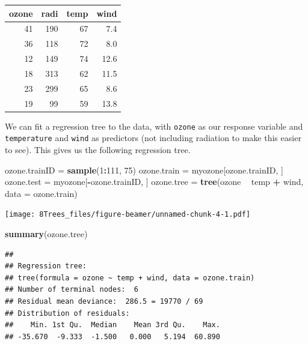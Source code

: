 \documentclass[10pt,ignorenonframetext,]{beamer}
\newenvironment{Shaded}{\begin{snugshade}}{\end{snugshade}}
\newcommand{\KeywordTok}[1]{\textcolor[rgb]{0.13,0.29,0.53}{\textbf{#1}}}
\newcommand{\DataTypeTok}[1]{\textcolor[rgb]{0.13,0.29,0.53}{#1}}
\newcommand{\DecValTok}[1]{\textcolor[rgb]{0.00,0.00,0.81}{#1}}
\newcommand{\StringTok}[1]{\textcolor[rgb]{0.31,0.60,0.02}{#1}}
\newcommand{\OperatorTok}[1]{\textcolor[rgb]{0.81,0.36,0.00}{\textbf{#1}}}
\newcommand{\NormalTok}[1]{#1}
\begin{document}
\begin{frame}[fragile]

\begin{tabular}{r|r|r|r}
\hline
ozone & radi & temp & wind\\
\hline
41 & 190 & 67 & 7.4\\
\hline
36 & 118 & 72 & 8.0\\
\hline
12 & 149 & 74 & 12.6\\
\hline
18 & 313 & 62 & 11.5\\
\hline
23 & 299 & 65 & 8.6\\
\hline
19 & 99 & 59 & 13.8\\
\hline
\end{tabular}

We can fit a regression tree to the data, with \texttt{ozone} as our
response variable and \texttt{temperature} and \texttt{wind} as
predictors (not including radiation to make this easier to see). This
gives us the following regression tree.

\end{frame}

\begin{frame}[fragile]

\footnotesize

\begin{Shaded}
\begin{Highlighting}[]
\NormalTok{ozone.trainID =}\StringTok{ }\KeywordTok{sample}\NormalTok{(}\DecValTok{1}\OperatorTok{:}\DecValTok{111}\NormalTok{, }\DecValTok{75}\NormalTok{)}
\NormalTok{ozone.train =}\StringTok{ }\NormalTok{myozone[ozone.trainID, ]}
\NormalTok{ozone.test =}\StringTok{ }\NormalTok{myozone[}\OperatorTok{-}\NormalTok{ozone.trainID, ]}
\NormalTok{ozone.tree =}\StringTok{ }\KeywordTok{tree}\NormalTok{(ozone }\OperatorTok{~}\StringTok{ }\NormalTok{temp }\OperatorTok{+}\StringTok{ }\NormalTok{wind, }\DataTypeTok{data =}\NormalTok{ ozone.train)}
\end{Highlighting}
\end{Shaded}

\texttt{[image: 8Trees\_files/figure-beamer/unnamed-chunk-4-1.pdf]}

\begin{Shaded}
\begin{Highlighting}[]
\KeywordTok{summary}\NormalTok{(ozone.tree)}
\end{Highlighting}
\end{Shaded}

\begin{verbatim}
## 
## Regression tree:
## tree(formula = ozone ~ temp + wind, data = ozone.train)
## Number of terminal nodes:  6 
## Residual mean deviance:  286.5 = 19770 / 69 
## Distribution of residuals:
##    Min. 1st Qu.  Median    Mean 3rd Qu.    Max. 
## -35.670  -9.333  -1.500   0.000   5.194  60.890
\end{verbatim}

\normalsize

\end{frame}
\end{document}
